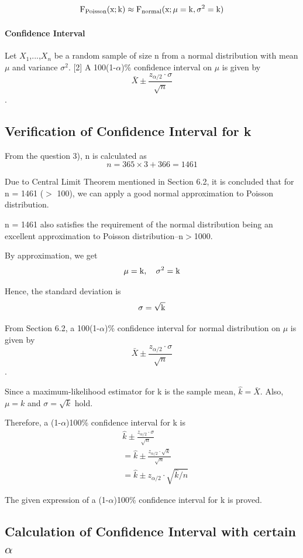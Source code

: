 \documentclass[a4paper]{article}
\begin{document}
$${\rm F_{Poisson}(x;k) \approx F_{normal}(x;\mu = k, \sigma^2 = k)}$$

\paragraph{Confidence Interval} Let $X_1$,...,$X_n$ be a random sample of size n from a normal distribution with mean $\mu$ and variance $\sigma^2$. [2] A 100(1-$\alpha$)\% confidence interval on $\mu$ is given by
$$\bar{X}\pm\frac{z_{\alpha/2}\cdot\sigma}{\sqrt{n}}$$. 
\subsection{Verification of Confidence Interval for k}

From the question 3), n is calculated as 
$$n= 365 \times 3 + 366 = 1461$$

Due to Central Limit Theorem mentioned in Section 6.2, it is concluded that for n = 1461 ($>$ 100), we can apply a good normal approximation to Poisson distribution. 

n = 1461 also satisfies the requirement of the normal distribution being an excellent approximation to Poisson distribution--n$>$1000.

By approximation, we get
$${\rm \mu = k,\quad \sigma^2 = k}$$

Hence, the standard deviation is 
$${\rm \sigma = \sqrt{k}}$$

From Section 6.2, a 100(1-$\alpha$)\% confidence interval for normal distribution on $\mu$ is given by
$$\bar{X}\pm\frac{z_{\alpha/2}\cdot\sigma}{\sqrt{n}}$$. 

Since a maximum-likelihood estimator for k is
the sample mean, $\hat{k} = \bar{X}$. Also, $\mu = k$ and $\sigma = \sqrt{k}$ hold.

Therefore, a (1-$\alpha$)100\% confidence interval for k is 
\begin{align*}
    &\hat{k}\pm \frac{z_{\alpha/2}\cdot\sigma}{\sqrt{n}}\\
    &= \hat{k}\pm \frac{z_{\alpha/2}\cdot\sqrt{k}}{\sqrt{n}}\\
    &= \hat{k}\pm z_{\alpha/2}\cdot\sqrt{\hat{k}/n}
\end{align*}

The given expression of a (1-$\alpha$)100\% confidence interval for k is proved.

\subsection{Calculation of Confidence Interval with certain $\alpha$}
\end{document}
